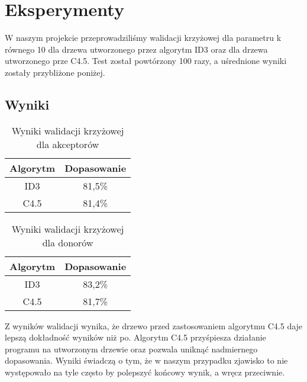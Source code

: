 \section{Eksperymenty}
W naszym projekcie przeprowadziliśmy walidacji krzyżowej dla parametru k równego 10 dla drzewa utworzonego przez algorytm ID3 oraz dla drzewa utworzonego prze C4.5. Test został powtórzony 100 razy, a uśrednione wyniki zostały przybliżone poniżej.

\subsection{Wyniki}



\begin{table}[H]
    \centering
    \begin{tabular}{|c|c|}
    \hline
    Algorytm                & Dopasowanie         \\ \hline
    ID3                     & 81,5\%              \\ \hline
    C4.5                    & 81,4\%              \\ \hline
    \end{tabular}
    \caption{Wyniki walidacji krzyżowej dla akceptorów}
    \label{tab:crossing}
\end{table}

\begin{table}[H]
    \centering
    \begin{tabular}{|c|c|}
    \hline
    Algorytm                & Dopasowanie         \\ \hline
    ID3                     & 83,2\%              \\ \hline
    C4.5                    & 81,7\%              \\ \hline
    \end{tabular}
    \caption{Wyniki walidacji krzyżowej dla donorów}
    \label{tab:crossing}
\end{table}

Z wyników walidacji wynika, że drzewo przed zastosowaniem algorytmu C4.5 daje lepszą dokładność wyników niż po. Algorytm C4.5 przyśpiesza działanie programu na utworzonym drzewie oraz pozwala uniknąć nadmiernego dopasowania. Wyniki świadczą o tym, że w naszym przypadku zjawisko to nie występowało na tyle często by polepszyć końcowy wynik, a wręcz przeciwnie.

